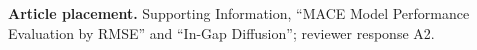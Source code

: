 \textbf{Article placement.} Supporting Information, ``MACE Model Performance Evaluation by RMSE'' and ``In-Gap Diffusion''; reviewer response A2.
